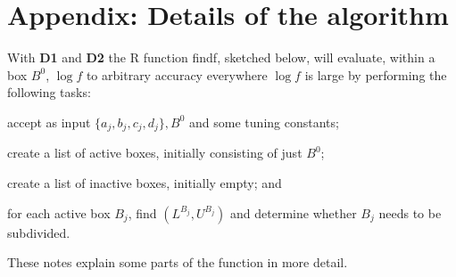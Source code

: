 \documentclass{report}
\newcommand{\textcompute}{\textsf}
\newcommand{\RL}{f}
\newcommand{\logRL}{\log\RL}
\begin{document}
\section{Appendix: Details of the algorithm}
With \textbf{D1} and \textbf{D2} the \textcompute{R} function \textcompute{findf}, sketched below, will evaluate, within a box $B^0$, $\logRL$ to arbitrary accuracy everywhere $\logRL$ is large by performing the following tasks:
\begin{enumerate*}[label=(\alph*)]
\item accept as input $\{a_j, b_j, c_j, d_j\}, B^0$ and some tuning constants;
\item create a list of active boxes, initially consisting of just $B^0$;
\item create a list of inactive boxes, initially empty; and
\item for each active box $B_j$, find $(L^{B_j}, U^{B_j})$ and determine whether $B_j$ needs to be subdivided.
\end{enumerate*}
 These notes explain some parts of the function in more detail.
\end{document}
